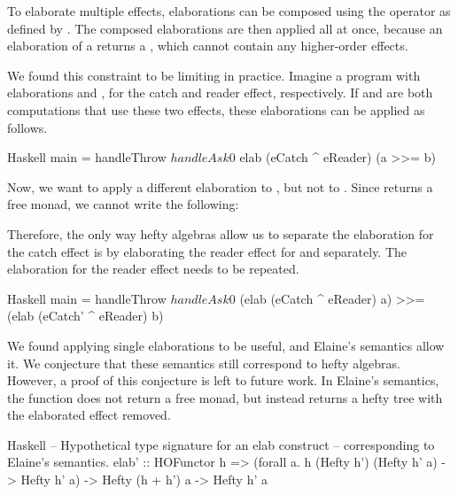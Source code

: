 
To elaborate multiple effects, elaborations can be composed using the \hs{^} operator as defined by \textcite{bach_poulsen_hefty_2023}. The composed elaborations are then applied all at once, because an elaboration of a  returns a , which cannot contain any higher-order effects.

We found this constraint to be limiting in practice. Imagine a program with elaborations  and , for the catch and reader effect, respectively. If  and  are both computations that use these two effects, these elaborations can be applied as follows.

\begin{lst}{Haskell}
main = handleThrow $ handleAsk 0 $
  elab (eCatch ^ eReader) (a >>= b)
\end{lst}
%
Now, we want to apply a different elaboration  to , but not to . Since  returns a free monad, we cannot write the following:

%
Therefore, the only way hefty algebras allow us to separate the elaboration for the catch effect is by elaborating the reader effect for  and  separately. The elaboration for the reader effect needs to be repeated.

\begin{lst}{Haskell}
main = handleThrow $ handleAsk 0 $
  (elab (eCatch ^ eReader) a)
    >>= (elab (eCatch' ^ eReader) b)
\end{lst}
%
We found applying single elaborations to be useful, and Elaine's semantics allow it. We conjecture that these semantics still correspond to hefty algebras. However, a proof of this conjecture is left to future work. In Elaine's semantics, the  function does not return a free monad, but instead returns a hefty tree with the elaborated effect removed.

\begin{lst}{Haskell}
-- Hypothetical type signature for an elab construct
-- corresponding to Elaine's semantics.
elab' :: HOFunctor h
  => (forall a. h (Hefty h') (Hefty h' a) -> Hefty h' a)
  -> Hefty (h + h') a
  -> Hefty h' a
\end{lst}

